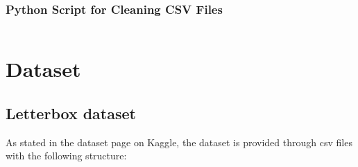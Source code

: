 \documentclass{Configuration_Files/PoliMi3i_thesis}
\begin{document}
\subsection*{Python Script for Cleaning CSV Files}

\inputminted{python}{letterboxd/letterboxdDataCleaning.py}

\chapter{Dataset}

\section{Letterbox dataset}

As stated in the dataset page on Kaggle, the dataset is provided through csv files with the following structure:
\end{document}
